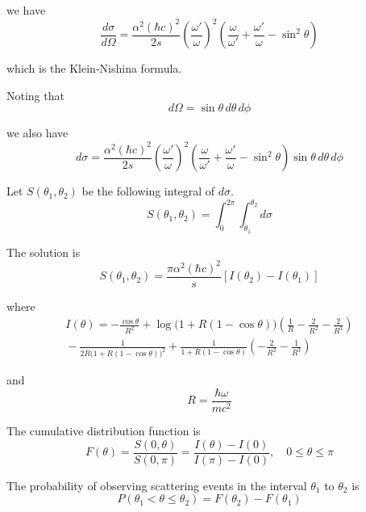 we have
\begin{equation*}
\frac{d\sigma}{d\Omega}
=\frac{\alpha^2(\hbar c)^2}{2s}
\left(\frac{\omega'}{\omega}\right)^2
\left(
\frac{\omega}{\omega'}+\frac{\omega'}{\omega}-\sin^2\theta
\right)
\end{equation*}

which is the Klein-Nishina formula.

\iffalse

Noting that
\begin{equation*}
d\Omega=\sin\theta\,d\theta\,d\phi
\end{equation*}

we also have
\begin{equation*}
d\sigma
=\frac{\alpha^2(\hbar c)^2}{2s}
\left(\frac{\omega'}{\omega}\right)^2
\left(
\frac{\omega}{\omega'}+\frac{\omega'}{\omega}-\sin^2\theta
\right)
\sin\theta\,d\theta\,d\phi
\end{equation*}

Let $S(\theta_1,\theta_2)$ be the following integral of $d\sigma$.
\begin{equation*}
S(\theta_1,\theta_2)=\int_0^{2\pi}\int_{\theta_1}^{\theta_2}d\sigma
\end{equation*}

The solution is
\begin{equation*}
S(\theta_1,\theta_2)=\frac{\pi\alpha^2(\hbar c)^2}{s}[I(\theta_2)-I(\theta_1)]
\end{equation*}

where
\begin{multline*}
I(\theta)=-\frac{\cos\theta}{R^2}
+\log\bigl(1+R(1-\cos\theta)\bigr)\left(\frac{1}{R}-\frac{2}{R^2}-\frac{2}{R^3}\right)
\\
{}-\frac{1}{2R\bigl(1+R(1-\cos\theta)\bigr)^2}
+\frac{1}{1+R(1-\cos\theta)}\left(-\frac{2}{R^2}-\frac{1}{R^3}\right)
\end{multline*}

and
\begin{equation*}
R=\frac{\hbar\omega}{mc^2}
\end{equation*}

The cumulative distribution function is
\begin{equation*}
F(\theta)
=\frac{S(0,\theta)}{S(0,\pi)}
=\frac{I(\theta)-I(0)}{I(\pi)-I(0)},
\quad
0\le\theta\le\pi
\end{equation*}

The probability of observing scattering events in the interval $\theta_1$ to $\theta_2$ is
\begin{equation*}
P(\theta_1<\theta\le\theta_2)=F(\theta_2)-F(\theta_1)
\end{equation*}

